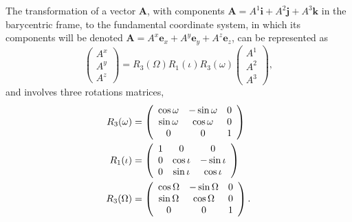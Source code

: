 The transformation of a vector $\textbf{A}$, with components $\textbf{A}= A^1 \textbf{i} + A^2 \textbf{j} + A^3\textbf{k}$ in the barycentric frame, to the fundamental coordinate system, in which its components will be denoted $\textbf{A}= A^x \textbf{e}_x + A^y \textbf{e}_y + A^z\textbf{e}_z$, can be represented as
\begin{equation}
 \left( \begin{array}{c}
 A^x \\
 A^y \\
 A^z
 \end{array}  \right) = R_3 (\Omega)  R_1 (\iota) R_3 (\omega) 
 \left( \begin{array}{c}
 A^1 \\
 A^2 \\
 A^3
 \end{array} \right), \label{eq:2BodyCoordinatesTransformation}
 \end{equation} 
 and involves three rotations matrices,
\begin{subequations}
\begin{align}
R_3 (\omega) &= \left( \begin{array}{c c c}
\cos \omega & -\sin \omega & 0 \\
\sin \omega & \cos \omega & 0 \\
0 & 0 & 1
\end{array} \right) \\
R_1 (\iota) &= \left( \begin{array}{c c c}
1 & 0 & 0 \\
0 & \cos \iota & - \sin \iota \\
0 & \sin \iota & \cos \iota
\end{array} \right) \\
R_3 (\Omega) &= \left( \begin{array}{c c c}
\cos \Omega & -\sin \Omega & 0 \\
\sin \Omega & \cos \Omega & 0 \\
0 & 0 & 1
\end{array} \right).
\end{align}
\end{subequations}

